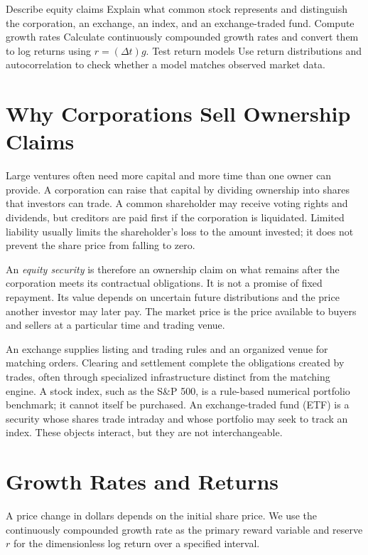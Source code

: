 \documentclass[11pt]{article}
\begin{document}

\learningobjectives
  {Describe equity claims}
  {Explain what common stock represents and distinguish the corporation, an exchange, an index, and an exchange-traded fund.}
  {Compute growth rates}
  {Calculate continuously compounded growth rates and convert them to log returns using $r=(\Delta t)g$.}
  {Test return models}
  {Use return distributions and autocorrelation to check whether a model matches observed market data.}

\section{Why Corporations Sell Ownership Claims}

Large ventures often need more capital and more time than one owner can provide. A corporation can raise that capital by dividing ownership into shares that investors can trade. A common shareholder may receive voting rights and dividends, but creditors are paid first if the corporation is liquidated. Limited liability usually limits the shareholder's loss to the amount invested; it does not prevent the share price from falling to zero.

An \emph{equity security} is therefore an ownership claim on what remains after the corporation meets its contractual obligations. It is not a promise of fixed repayment. Its value depends on uncertain future distributions and the price another investor may later pay. The market price is the price available to buyers and sellers at a particular time and trading venue.

An exchange supplies listing and trading rules and an organized venue for matching orders. Clearing and settlement complete the obligations created by trades, often through specialized infrastructure distinct from the matching engine. A stock index, such as the S\&P 500, is a rule-based numerical portfolio benchmark; it cannot itself be purchased. An exchange-traded fund (ETF) is a security whose shares trade intraday and whose portfolio may seek to track an index. These objects interact, but they are not interchangeable.

\section{Growth Rates and Returns}

A price change in dollars depends on the initial share price. We use the continuously compounded growth rate as the primary reward variable and reserve $r$ for the dimensionless log return over a specified interval.
\end{document}
